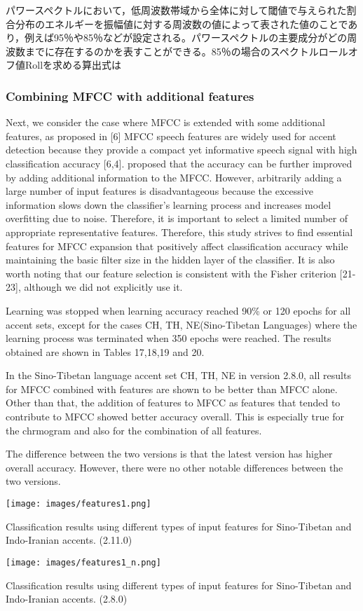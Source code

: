 パワースペクトルにおいて，低周波数帯域から全体に対して閾値で与えられた割合分布のエネルギーを振幅値に対する周波数の値によって表された値のことであり，例えば95％や85％などが設定される。パワースペクトルの主要成分がどの周波数までに存在するのかを表すことができる。85％の場合のスペクトルロールオフ値Rollを求める算出式は\documentclass[ams]{U-AizuGT}
\begin{document}
\subsubsection{Combining MFCC with additional features}
Next, we consider the case where MFCC is extended with some additional features, as proposed in [6] MFCC speech features are widely used for accent detection because they provide a compact yet informative speech signal with high classification accuracy [6,4]. proposed that the accuracy can be further improved by adding additional information to the MFCC. However, arbitrarily adding a large number of input features is disadvantageous because the excessive information slows down the classifier's learning process and increases model overfitting due to noise. Therefore, it is important to select a limited number of appropriate representative features. Therefore, this study strives to find essential features for MFCC expansion that positively affect classification accuracy while maintaining the basic filter size in the hidden layer of the classifier. It is also worth noting that our feature selection is consistent with the Fisher criterion [21-23], although we did not explicitly use it.\par
Learning was stopped when learning accuracy reached 90\% or 120 epochs for all accent sets, except for the cases {CH, TH, NE}(Sino-Tibetan Languages) where the learning process was terminated when 350 epochs were reached. The results obtained are shown in Tables 17,18,19 and 20.\par
In the Sino-Tibetan language accent set {CH, TH, NE} in version 2.8.0, all results for MFCC combined with features are shown to be better than MFCC alone. Other than that, the addition of features to MFCC as features that tended to contribute to MFCC showed better accuracy overall. This is especially true for the chrmogram and also for the combination of all features.\par
The difference between the two versions is that the latest version has higher overall accuracy. However, there were no other notable differences between the two versions.
\begin{table}[h]
    \centering
    \texttt{[image: images/features1.png]}
    \caption{Classification results using different types of input features for Sino-Tibetan and Indo-Iranian accents. (2.11.0)}
\end{table}
\begin{table}[h]
    \centering
    \texttt{[image: images/features1\_n.png]}
    \caption{Classification results using different types of input features for Sino-Tibetan and Indo-Iranian accents. (2.8.0)}
\end{table}
\end{document}
